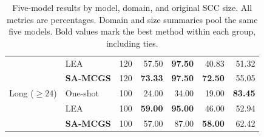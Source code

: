 \begin{table}[t]
\begin{minipage}[t]{.49\textwidth}
\begin{tabular}{@{}llrrrrr@{}}
 & LEA & 120 & 57.50 & \textbf{97.50} & 40.83 & 51.32 \\
 & \textbf{SA-MCGS} & 120 & \textbf{73.33} & \textbf{97.50} & \textbf{72.50} & 55.05 \\
\midrule
Long ($\geq$24) & One-shot & 100 & 24.00 & 34.00 & 19.00 & \textbf{83.45} \\
 & LEA & 100 & \textbf{59.00} & \textbf{95.00} & 46.00 & 52.94 \\
 & \textbf{SA-MCGS} & 100 & 57.00 & 87.00 & \textbf{58.00} & 62.42 \\
\bottomrule
\end{tabular}
\end{minipage}
\caption{Five-model results by model, domain, and original SCC size. All metrics are percentages. Domain and size summaries pool the same five models. Bold values mark the best method within each group, including ties.}
\label{tab:appendix_breakdowns}
\end{table}
